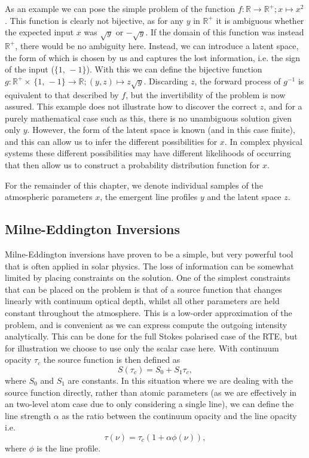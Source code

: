 As an example we can pose the simple problem of the function $f : \mathbb{R} \rightarrow \mathbb{R}^+; x \mapsto x^2$. This function is clearly not bijective, as for any $y$ in $\mathbb{R}^+$ it is ambiguous whether the expected input $x$ was $\sqrt{y}$ or $-\sqrt{y}$.
If the domain of this function was instead $\mathbb{R}^+$, there would be no ambiguity here.
Instead, we can introduce a latent space, the form of which is chosen by us and captures the lost information, i.e. the sign of the input ($\{1,\,-1\}$).
With this we can define the bijective function $g : \mathbb{R}^+\times\,\{1,\,-1\} \rightarrow \mathbb{R}; (y, z) \mapsto z \sqrt{y}$.
Discarding $z$, the forward process of $g^{-1}$ is equivalent to that described by $f$, but the invertibility of the problem is now assured.
This example does not illustrate how to discover the correct $z$, and for a purely mathematical case such as this, there is no unambiguous solution given only $y$.
However, the form of the latent space is known (and in this case finite), and this can allow us to infer the different possibilities for $x$.
In complex physical systems these different possibilities may have different likelihoods of occurring that then allow us to construct a probability distribution function for $x$.

For the remainder of this chapter, we denote individual samples of the atmospheric parameters $x$, the emergent line profiles $y$ and the latent space $z$.

\subsection{Milne-Eddington Inversions}

Milne-Eddington inversions have proven to be a simple, but very powerful tool that is often applied in solar physics.
The loss of information can be somewhat limited by placing constraints on the solution. One of the simplest constraints that can be placed on the problem is that of a source function that changes linearly with continuum optical depth, whilst all other parameters are held constant throughout the atmosphere.
This is a low-order approximation of the problem, and is convenient as we can express compute the outgoing intensity analytically.
This can be done for the full Stokes polarised case of the RTE, but for illustration we choose to use only the scalar case here.
With continuum opacity $\tau_c$ the source function is then defined as
\begin{equation}
    S(\tau_c) = S_0 + S_1 \tau_c,
\end{equation}
where $S_0$ and $S_1$ are constants.
In this situation where we are dealing with the source function directly, rather than atomic parameters (as we are effectively in an two-level atom case due to only considering a single line), we can define the line strength $\alpha$ as the ratio between the continuum opacity and the line opacity i.e.
\begin{equation}
    \tau(\nu) = \tau_c (1 + \alpha \phi(\nu)),
\end{equation}
where $\phi$ is the line profile.

